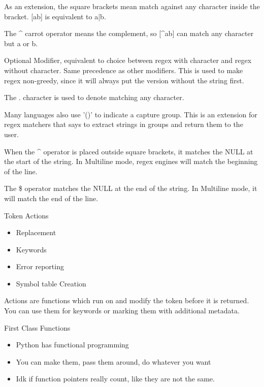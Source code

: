 \documentclass{report}
\begin{document}
\begin{description}
\begin{itemize}
\begin{mdframed}
                    As an extension, the square brackets mean match against any character inside
                    the bracket. [ab] is equivalent to a|b.

                    The \^{} carrot operator means the complement, so [\^{}ab] can match any character but
                    a or b.

                    Optional Modifier, equivalent to choice between regex with character and regex without
                    character. Same precedence as other modifiers. This is used to make regex non-greedy,
                    since it will always put the version without the string first.

                    The . character is used to denote matching any character.

                    Many languages also use '()' to indicate a capture group. This is an extension for
                    regex matchers that says to extract strings in groups and return them to the user.

                    When the \^{} operator is placed outside square brackets, it matches the NULL at
                    the start of the string. In Multiline mode, regex engines will match the beginning
                    of the line.

                    The \$ operator matches the NULL at the end of the string. In Multiline mode,
                    it will match the end of the line.

                \end{mdframed}
        \end{itemize}
    \item Token Actions
        \begin{itemize}
            \item Replacement
            \item Keywords
            \item Error reporting
            \item Symbol table Creation
        \end{itemize}
        \begin{mdframed}
            Actions are functions which run on and modify
            the token before it is returned. You can use
            them for keywords or marking them with additional
            metadata.
        \end{mdframed}
    \item First Class Functions
        \begin{itemize}
            \item Python has functional programming
            \item You can make them, pass them around, do whatever you want
            \item Idk if function pointers really count, like they are not the same.
        \end{itemize}
\end{description}
\end{document}
